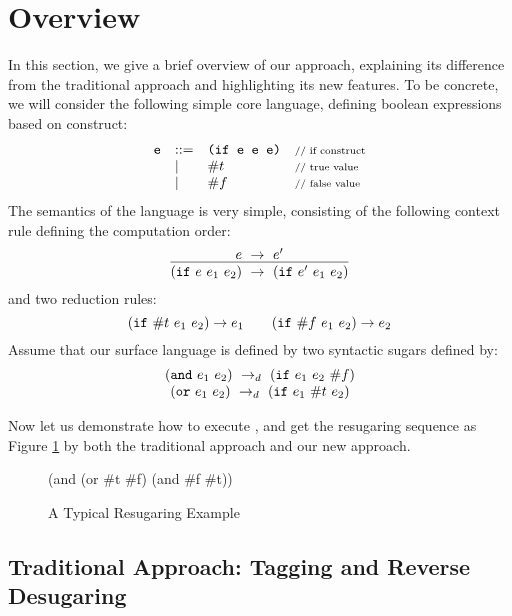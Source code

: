 \section{Overview}
\label{sec2}

In this section, we give a brief overview of our approach, explaining its difference from the traditional approach and highlighting its new features. To be concrete, we will consider the following simple core language, defining boolean expressions based on  construct:
\[
\begin{array}{lllll}
\mbox{\tt e} &::=& \texttt{(if~e~e~e)} &\mbox{{\scriptsize // if construct}}\\
& |& \#t  & \mbox{{\scriptsize // true value}}\\
& |& \#f & \mbox{{\scriptsize // false value}}
\end{array}
\]
The semantics of the language is very simple, consisting of the following context rule defining the computation order:
\[
\centering
\infer
{(\m{if}~e~e_1~e_2)~\rightarrow~(\m{if}~e'~e_1~e_2)}
{e~\rightarrow~e'}
\]
and two reduction rules:
\[
\centering
(\m{if}~\#t~e_1~e_2) \rightarrow e_1 \qquad (\m{if}~\#f~e_1~e_2) \rightarrow e_2
\]
Assume that our surface language is defined by two syntactic sugars defined by:
\[
\begin{array}{c}
(\mbox{\tt and}~e_1~e_2) ~\rightarrow_d~ (\mbox{\tt if}~e_1~e_2~\#f)\\
(\mbox{\tt or}~e_1~e_2) ~\rightarrow_d~ (\mbox{\tt if}~e_1~\#t~e_2)
\end{array}
\]


Now let us demonstrate how to execute , and get the resugaring sequence as Figure \ref{fig:standard} by both the traditional approach and our new approach.

\begin{figure}[t]
\begin{center}
\begin{minipage}{6cm}
\begin{Codes}
    (and (or \#t \#f) (and \#f \#t))
\end{Codes}
\end{minipage}
\end{center}
\caption{A Typical Resugaring Example}
\label{fig:standard}
\end{figure}




\subsection{Traditional Approach: Tagging and Reverse Desugaring}

